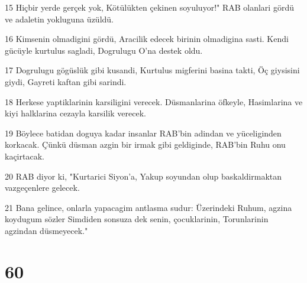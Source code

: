 \par 15 Hiçbir yerde gerçek yok, Kötülükten çekinen soyuluyor!" RAB olanlari gördü ve adaletin yokluguna üzüldü.
\par 16 Kimsenin olmadigini gördü, Aracilik edecek birinin olmadigina sasti. Kendi gücüyle kurtulus sagladi, Dogrulugu O'na destek oldu.
\par 17 Dogrulugu gögüslük gibi kusandi, Kurtulus migferini basina takti, Öç giysisini giydi, Gayreti kaftan gibi sarindi.
\par 18 Herkese yaptiklarinin karsiligini verecek. Düsmanlarina öfkeyle, Hasimlarina ve kiyi halklarina cezayla karsilik verecek.
\par 19 Böylece batidan doguya kadar insanlar RAB'bin adindan ve yüceliginden korkacak. Çünkü düsman azgin bir irmak gibi geldiginde, RAB'bin Ruhu onu kaçirtacak.
\par 20 RAB diyor ki, "Kurtarici Siyon'a, Yakup soyundan olup baskaldirmaktan vazgeçenlere gelecek.
\par 21 Bana gelince, onlarla yapacagim antlasma sudur: Üzerindeki Ruhum, agzina koydugum sözler Simdiden sonsuza dek senin, çocuklarinin, Torunlarinin agzindan düsmeyecek."

\chapter{60}

